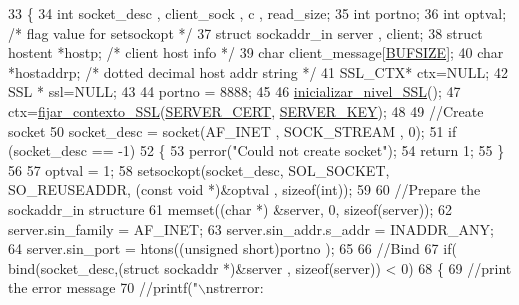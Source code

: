 \begin{DoxyCode}
33 \{
34         \textcolor{keywordtype}{int} socket\_desc , client\_sock , c , read\_size;
35         \textcolor{keywordtype}{int} portno;
36         \textcolor{keywordtype}{int} optval; \textcolor{comment}{/* flag value for setsockopt */}
37         \textcolor{keyword}{struct }sockaddr\_in server , client;
38         \textcolor{keyword}{struct }hostent *hostp; \textcolor{comment}{/* client host info */}
39         \textcolor{keywordtype}{char} client\_message[\hyperlink{_g-2361-06-_p3-echo__server_s_s_l_8c_aeca034f67218340ecb2261a22c2f3dcd}{BUFSIZE}];
40         \textcolor{keywordtype}{char} *hostaddrp; \textcolor{comment}{/* dotted decimal host addr string */}
41         SSL\_CTX* ctx=NULL;
42         SSL * ssl=NULL;
43          
44         portno = 8888;
45         
46         \hyperlink{_g-2361-06-_p3-funciones__ssl_8h_a937108af8fd0832377b084e24172ee41}{inicializar\_nivel\_SSL}();
47         ctx=\hyperlink{_g-2361-06-_p3-funciones__ssl_8h_a9d58ced0f4bab693b1c8d8b7eabe10a2}{fijar\_contexto\_SSL}(\hyperlink{_g-2361-06-_p3-funciones__ssl_8h_a99a438eb7c7b1f8f8860e65f8818d152}{SERVER\_CERT}, 
      \hyperlink{_g-2361-06-_p3-funciones__ssl_8h_a407c2e21300d77cb31c5c30b37324c87}{SERVER\_KEY});
48 
49         \textcolor{comment}{//Create socket}
50         socket\_desc = socket(AF\_INET , SOCK\_STREAM , 0);
51         \textcolor{keywordflow}{if} (socket\_desc == -1)
52         \{
53                 perror(\textcolor{stringliteral}{"Could not create socket"});
54                 \textcolor{keywordflow}{return} 1;
55         \}
56         
57         optval = 1;
58         setsockopt(socket\_desc, SOL\_SOCKET, SO\_REUSEADDR, (\textcolor{keyword}{const} \textcolor{keywordtype}{void} *)&optval , \textcolor{keyword}{sizeof}(\textcolor{keywordtype}{int}));
59 
60         \textcolor{comment}{//Prepare the sockaddr\_in structure}
61         memset((\textcolor{keywordtype}{char} *) &server, 0, \textcolor{keyword}{sizeof}(server));
62         server.sin\_family = AF\_INET;
63         server.sin\_addr.s\_addr = INADDR\_ANY;
64         server.sin\_port = htons((\textcolor{keywordtype}{unsigned} \textcolor{keywordtype}{short})portno );
65          
66         \textcolor{comment}{//Bind}
67         \textcolor{keywordflow}{if}( bind(socket\_desc,(\textcolor{keyword}{struct} sockaddr *)&server , \textcolor{keyword}{sizeof}(server)) < 0)
68         \{
69                 \textcolor{comment}{//print the error message}
70                 \textcolor{comment}{//printf("\(\backslash\)nstrerror: %
}
\end{DoxyCode}
